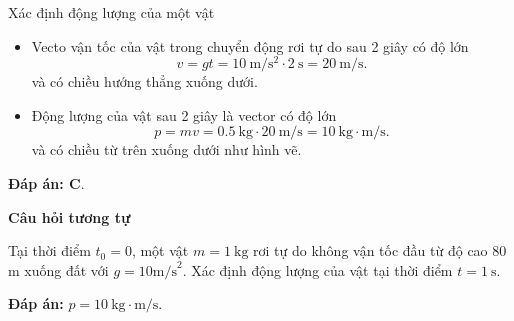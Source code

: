 \begin{dang}{Xác định động lượng của một vật}
{		\begin{itemize}
			\item Vecto vận tốc của vật trong chuyển động rơi tự do sau 2 giây có độ lớn 
			\begin{equation*}
				v=g  t =\SI{10}{\meter/\second^2}\cdot\SI{2}{\second}= 20 \ \text{m/s}.
			\end{equation*}
			và có chiều hướng thẳng xuống dưới.
			
			\item Động lượng của vật sau 2 giây là vector có độ lớn 			
			\begin{equation*}
				p=mv= \SI{0.5}{\kilogram}\cdot\SI{20}{\meter/\second}=10\ \text{kg} \cdot \text{m/s}.
			\end{equation*}
			và có chiều từ trên xuống dưới như hình vẽ.
		\end{itemize}
		
		\textbf{Đáp án: C}.
		
		\begin{center}
			\textbf{Câu hỏi tương tự}
		\end{center}
		
		Tại thời điểm $t_0=0$, một vật $m = 1\ \text{kg}$ rơi tự do không vận tốc đầu từ độ cao 80 m xuống đất với $g=10 \text{m/s}^2$. Xác định động lượng của vật tại thời điểm $t = 1\ \text{s}$.
		
		\textbf{Đáp án:} $p=10\ \text{kg} \cdot \text{m/s}$.
	}
\end{dang}


